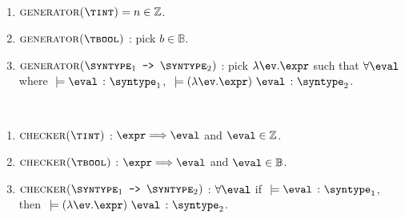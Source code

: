 \begin{definition}
  \label{def_genCore}
  \ \par 
  \begin{enumerate}
    \item $\mkgen{$\tint$} = n \in \mathbb{Z}$.
    \item $\mkgen{$\tbool$}$ : pick $b \in \mathbb{B}$.
    \item $\mkgen{$\mkfun{\syntype_1}{\syntype_2}$}$ : pick $\mklambda{\ev}{\expr}$ such that $\forall \eval$ where $\ \models \hastype{\eval}{\syntype_1}$, $\ \models \hastype{(\mklambda{\ev}{\expr})\ \eval}{\syntype_2}$.
  \end{enumerate}
\end{definition}

\begin{definition}
  \label{def_CheCore}
  \ \par 
  \begin{enumerate}
    \item $\mkche{$\tint$}$ : $\expr \Longrightarrow \eval$ and $\eval \in \mathbb{Z}$.
    \item $\mkche{$\tbool$}$ : $\expr \Longrightarrow \eval$ and $\eval \in \mathbb{B}$.
    \item $\mkche{$\mkfun{\syntype_1}{\syntype_2}$}$ : $\forall \eval$ if $\ \models \hastype{\eval}{\syntype_1}$, then $\ \models \hastype{(\mklambda{\ev}{\expr})\ \eval}{\syntype_2}$.
  \end{enumerate}
\end{definition}